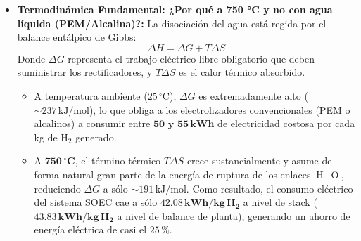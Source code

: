 \documentclass[11pt,a4paper]{article}
\begin{document}
\begin{itemize}
\begin{enumerate}
        \item \textbf{Ánodo de oxígeno (LSM - Manganita de Lantano y Estroncio):} Al llegar al ánodo poroso, los iones $\text{O}^{2-}$ se oxidan, entregan sus electrones al circuito eléctrico externo y se recombinan para formar gas oxígeno puro:
        \begin{equation}
            \text{O}^{2-} \longrightarrow \frac{1}{2}\,\text{O}_{2\,(g)} + 2\,e^-
        \end{equation}
        Este oxígeno puro a alta presión ($19.4\,\text{bar}$) sale por la corriente \texttt{S-05} ($315.60\,\text{kmol/h} = 10{,}098.8\,\text{kg/h}$), se enfría y se valoriza comercialmente como oxígeno medicinal e industrial.
    \end{enumerate}

    \item \textbf{Termodinámica Fundamental: ¿Por qué a 750 °C y no con agua líquida (PEM/Alcalina)?:}  
    La disociación del agua está regida por el balance entálpico de Gibbs:
    \begin{equation}
        \Delta H = \Delta G + T\Delta S
    \end{equation}
    Donde $\Delta G$ representa el trabajo eléctrico libre obligatorio que deben suministrar los rectificadores, y $T\Delta S$ es el calor térmico absorbido.
    \begin{itemize}
        \item A temperatura ambiente ($25\,^\circ\text{C}$), $\Delta G$ es extremadamente alto ($\sim 237\,\text{kJ/mol}$), lo que obliga a los electrolizadores convencionales (PEM o alcalinos) a consumir entre $\mathbf{50\text{ y }55\,\text{kWh}}$ de electricidad costosa por cada kg de $\text{H}_2$ generado.
        \item A $\mathbf{750\,^\circ\text{C}}$, el término térmico $T\Delta S$ crece sustancialmente y asume de forma natural gran parte de la energía de ruptura de los enlaces $\text{H}-\text{O}$, reduciendo $\Delta G$ a sólo $\sim 191\,\text{kJ/mol}$. Como resultado, el consumo eléctrico del sistema SOEC cae a sólo $\mathbf{42.08\,\text{kWh/kg}\,\text{H}_2}$ a nivel de stack ($\mathbf{43.83\,\text{kWh/kg}\,\text{H}_2}$ a nivel de balance de planta), generando un ahorro de energía eléctrica de casi el $25\,\%$.
    \end{itemize}


\end{itemize}
\end{document}
